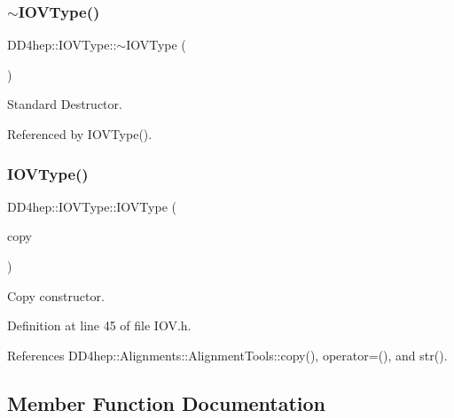 \subsubsection{\texorpdfstring{$\sim$\+I\+O\+V\+Type()}{~IOVType()}}
{\footnotesize\ttfamily D\+D4hep\+::\+I\+O\+V\+Type\+::$\sim$\+I\+O\+V\+Type (\begin{DoxyParamCaption}{ }\end{DoxyParamCaption})\hspace{0.3cm}{\ttfamily [default]}}



Standard Destructor. 



Referenced by I\+O\+V\+Type().

\hypertarget{class_d_d4hep_1_1_i_o_v_type_a89eb725303b66a7a2a3b2198f96a4913}{}\label{class_d_d4hep_1_1_i_o_v_type_a89eb725303b66a7a2a3b2198f96a4913} 
\subsubsection{\texorpdfstring{I\+O\+V\+Type()}{IOVType()}\hspace{0.1cm}{\footnotesize\ttfamily [2/2]}}
{\footnotesize\ttfamily D\+D4hep\+::\+I\+O\+V\+Type\+::\+I\+O\+V\+Type (\begin{DoxyParamCaption}\item[{const \hyperlink{class_d_d4hep_1_1_i_o_v_type}{I\+O\+V\+Type} \&}]{copy }\end{DoxyParamCaption})\hspace{0.3cm}{\ttfamily [inline]}}



Copy constructor. 



Definition at line 45 of file I\+O\+V.\+h.



References D\+D4hep\+::\+Alignments\+::\+Alignment\+Tools\+::copy(), operator=(), and str().



\subsection{Member Function Documentation}
\hypertarget{class_d_d4hep_1_1_i_o_v_type_a7c7f28fc3cd9f5f32ba33cdd5c12a43a}{}\label{class_d_d4hep_1_1_i_o_v_type_a7c7f28fc3cd9f5f32ba33cdd5c12a43a} 

